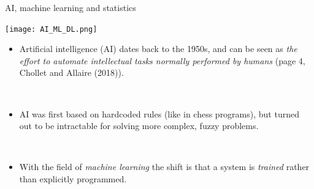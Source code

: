 \documentclass[10pt,ignorenonframetext,]{beamer}
\providecommand{\tightlist}{%
  \setlength{\itemsep}{0pt}\setlength{\parskip}{0pt}}
\begin{document}
\begin{frame}

\begin{block}{AI, machine learning and statistics}

\texttt{[image: AI\_ML\_DL.png]}

\end{block}

\end{frame}

\begin{frame}

\begin{itemize}
\tightlist
\item
  Artificial intelligence (AI) dates back to the 1950s, and can be seen
  as \emph{the effort to automate intellectual tasks normally performed
  by humans} (page 4, Chollet and Allaire (2018)).
\end{itemize}

\(~\)

\begin{itemize}
\tightlist
\item
  AI was first based on hardcoded rules (like in chess programs), but
  turned out to be intractable for solving more complex, fuzzy problems.
\end{itemize}

\(~\)

\begin{itemize}
\tightlist
\item
  With the field of \emph{machine learning} the shift is that a system
  is \emph{trained} rather than explicitly programmed.
\end{itemize}

\end{frame}
\end{document}
